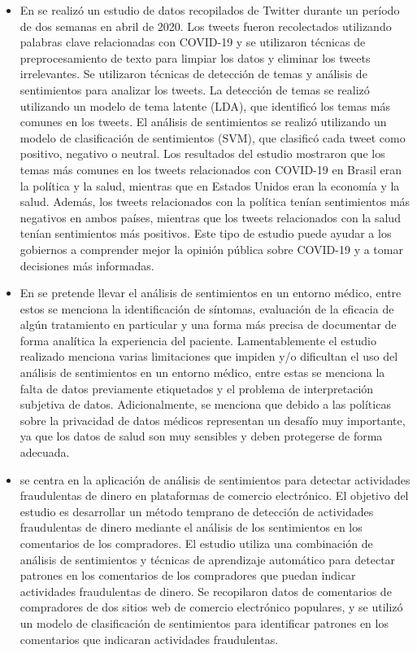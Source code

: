 \documentclass[12pt, conference]{IEEEtran}
\begin{document}
\begin{itemize}
 \item En \cite{r16} se realizó un estudio de datos recopilados de Twitter durante un período de dos semanas en abril de 2020. Los tweets fueron recolectados utilizando palabras clave relacionadas con COVID-19 y se utilizaron técnicas de preprocesamiento de texto para limpiar los datos y eliminar los tweets irrelevantes. Se utilizaron técnicas de detección de temas y análisis de sentimientos para analizar los tweets. La detección de temas se realizó utilizando un modelo de tema latente (LDA), que identificó los temas más comunes en los tweets. El análisis de sentimientos se realizó utilizando un modelo de clasificación de sentimientos (SVM), que clasificó cada tweet como positivo, negativo o neutral. Los resultados del estudio mostraron que los temas más comunes en los tweets relacionados con COVID-19 en Brasil eran la política y la salud, mientras que en Estados Unidos eran la economía y la salud. Además, los tweets relacionados con la política tenían sentimientos más negativos en ambos países, mientras que los tweets relacionados con la salud tenían sentimientos más positivos. Este tipo de estudio puede ayudar a los gobiernos a comprender mejor la opinión pública sobre COVID-19 y a tomar decisiones más informadas.
 \item En \cite{r15} se pretende llevar el análisis de sentimientos en un entorno médico, entre estos se menciona la identificación de síntomas, evaluación de la eficacia de algún tratamiento en particular y una forma más precisa de documentar de forma analítica la experiencia del paciente. Lamentablemente el estudio realizado menciona varias limitaciones que impiden y/o dificultan el uso del análisis de sentimientos en un entorno médico, entre estas se menciona la falta de datos previamente etiquetados y el problema de interpretación subjetiva de datos. Adicionalmente, se menciona que debido a las políticas sobre la privacidad de datos médicos representan un desafío muy importante, ya que los datos de salud son muy sensibles y deben protegerse de forma adecuada.
 \item \cite{r14} se centra en la aplicación de análisis de sentimientos para detectar actividades fraudulentas de dinero en plataformas de comercio electrónico. El objetivo del estudio es desarrollar un método temprano de detección de actividades fraudulentas de dinero mediante el análisis de los sentimientos en los comentarios de los compradores. El estudio utiliza una combinación de análisis de sentimientos y técnicas de aprendizaje automático para detectar patrones en los comentarios de los compradores que puedan indicar actividades fraudulentas de dinero. Se recopilaron datos de comentarios de compradores de dos sitios web de comercio electrónico populares, y se utilizó un modelo de clasificación de sentimientos para identificar patrones en los comentarios que indicaran actividades fraudulentas.

\end{itemize}
\end{document}
